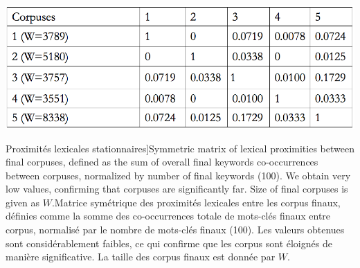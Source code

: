 \begin{table}
\centering
\includegraphics[width=\textwidth]{Figures/QuantEpistemo/corpusesDistances}
\caption[Stationary lexical proximities][Proximités lexicales stationnaires]{Symmetric matrix of lexical proximities between final corpuses, defined as the sum of overall final keywords co-occurrences between corpuses, normalized by number of final keywords (100). We obtain very low values, confirming that corpuses are significantly far. Size of final corpuses is given as $W$.}{Matrice symétrique des proximités lexicales entre les corpus finaux, définies comme la somme des co-occurrences totale de mots-clés finaux entre corpus, normalisé par le nombre de mots-clés finaux (100). Les valeurs obtenues sont considérablement faibles, ce qui confirme que les corpus sont éloignés de manière significative. La taille des corpus finaux est donnée par $W$. }
\label{tab:quantepistemo:lexical}
\end{table}







